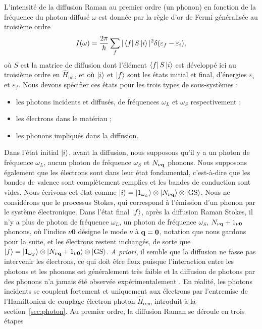 L'intensité de la diffusion Raman au premier ordre (un phonon) en fonction de la fréquence du photon diffusé $\omega$ est donnée par la règle d'or de Fermi généralisée au troisième ordre~\cite{heitlerQuantumTheoryRadiation1954}
\begin{equation}
    I(\omega) = \frac{2\pi}{\hbar}\sum_f|\bra{f}S\ket{i}|^2\delta(\varepsilon_f-\varepsilon_i),\label{eqn:fermi3}
\end{equation}
où $S$ est la matrice de diffusion dont l'élément $\bra{f}S\ket{i}$ est développé ici au troisième ordre en $\hat{H}_\text{int}$, et où $\ket{i}$ et $\ket{f}$ sont les états initial et final, d'énergies $\varepsilon_i$ et $\varepsilon_f$. Nous devons spécifier ces états pour les trois types de sous-systèmes :
\begin{itemize}
    \item les photons incidents et diffusés, de fréquences $\omega_L$ et $\omega_S$ respectivement ;
    \item les électrons dans le matériau ;
    \item les phonons impliqués dans la diffusion.
\end{itemize}
Dans l'état initial $\ket{i}$, avant la diffusion, nous supposons qu'il y a un photon de fréquence $\omega_L$, aucun photon de fréquence $\omega_S$ et $N_{\nu\mathbf{q}}$ phonons. Nous supposons également que les électrons sont dans leur état fondamental, c'est-à-dire que les bandes de valence sont complètement remplies et les bandes de conduction sont vides. Nous écrivons cet état comme $\ket{i}=\ket{1_{\omega_L}}\otimes\ket{N_{\nu\mathbf{q}}}\otimes\ket{\text{GS}}$. Nous ne considérons que le processus Stokes, qui correspond à l'émission d'un phonon par le système électronique. Dans l'état final $\ket{f}$, après la diffusion Raman Stokes, il n'y a plus de photon de fréquence $\omega_L$, un photon de fréquence $\omega_S$, $N_{\nu\mathbf{q}}+1_{\nu\bm 0}$ phonons, où l'indice $\nu\bm 0$ désigne le mode $\nu$ à $\mathbf{q}=\bm 0$, notation que nous gardons pour la suite, et les électrons restent inchangés, de sorte que $\ket{f}=\ket{1_{\omega_S}}\otimes\ket{N_{\nu\mathbf{q}}+1_{\nu\bm 0}}\otimes\ket{\text{GS}}$. \textit{A priori}, il semble que la diffusion ne fasse pas intervenir les électrons, ce qui doit être faux puisque l'interaction entre les photons et les phonons est généralement très faible et la diffusion de photons par des phonons n'a jamais été observée expérimentalement \cite{yuFundamentalsSemiconductorsPhysics2010}. En réalité, les photons incidents se couplent fortement et uniquement aux électrons par l'entremise de l'Hamiltonien de couplage électron-photon $\hat{H}_\text{eem}$ introduit à la section~\ref{sec:photon}. Au premier ordre, la diffusion Raman se déroule en trois étapes
